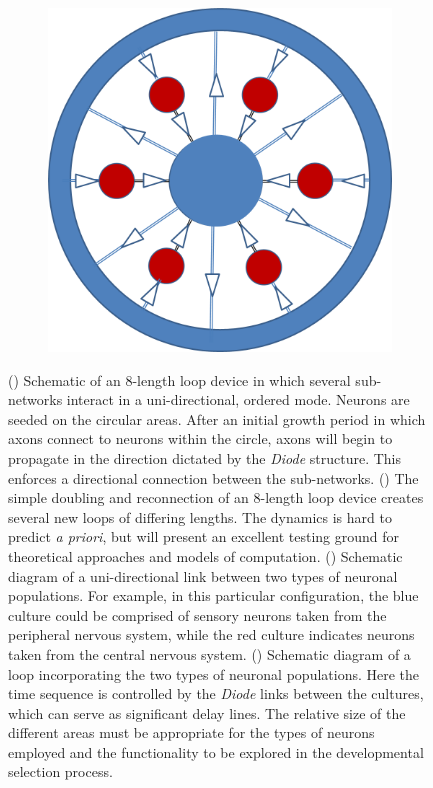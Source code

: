 \begin{figure}
\begin{center}
\begin{subfigure}[b]{0.24\linewidth}
\begin{center}
\end{center}
\end{subfigure}
\begin{subfigure}[b]{0.24\linewidth}
\begin{center}
\includegraphics[width=0.62\linewidth]{../fig/expdesign5.png}\subcaption{}\label{fig:expdesign5}
\end{center}
\end{subfigure}
\end{center}
\caption{() Schematic of an 8-length loop device in which several sub-networks interact in a uni-directional, ordered mode. Neurons are seeded on the circular areas. After an initial growth period in which axons connect to neurons within the circle, axons will begin to propagate in the direction dictated by the {\it Diode} structure. This enforces a directional connection between the sub-networks. () The simple doubling and reconnection of an 8-length loop device creates several new loops of differing lengths. The dynamics is hard to predict {\it a priori}, but will present an excellent testing ground for theoretical approaches and models of computation. () Schematic diagram of a uni-directional link between two types of neuronal populations. For example, in this particular configuration, the blue culture could be comprised of sensory neurons taken from the peripheral nervous system, while the red culture indicates neurons taken from the central nervous system. () Schematic diagram of a loop incorporating the two types of neuronal populations. Here the time sequence is controlled by the {\it Diode} links between the cultures, which can serve as significant delay lines. The relative size of the different areas must be appropriate for the types of neurons employed and the functionality to be explored in the developmental selection process.}
\end{figure}


